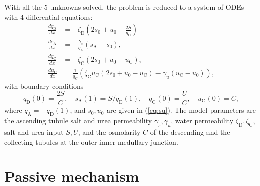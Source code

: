 \documentclass{article}
\numberwithin{equation}{section} %
\begin{document}
With all the 5 unknowns solved, the problem is reduced to a system of ODEs with 4 differential equations:
\begin{align}
    \frac{dq_\mathrm{D}}{dx} &= -\zeta_\mathrm{D}\left( 2s_0+u_0-\frac{2S}{q_\mathrm{D}} \right) \label{eq:sys_q_D}\\
    \frac{ds_\mathrm{A}}{dx} &= -\frac{\gamma_s}{q_\mathrm{A}}(s_\mathrm{A} - s_0),\label{eq:sys_s}\\
    \frac{dq_\mathrm{C}}{dx} &= -\zeta_\mathrm{C}(2s_0+u_0-u_\mathrm{C}),\label{eq:sys_q_C}\\
    \frac{du_\mathrm{C}}{dx} &= \frac{1}{q_\mathrm{C}}\left(\zeta_\mathrm{C}u_\mathrm{C}(2 s_0+u_0 - u_\mathrm{C})- \gamma_u(u_\mathrm{C} - u_0)\right),\label{eq:sys_u}
\end{align}
    with boundary conditions
\begin{equation}\label{eq:sys_bdry}
        q_\mathrm{D}(0) = \frac{2S}{C},\quad
        s_\mathrm{A}(1) = S/q_\mathrm{D}(1),\quad
         q_\mathrm{C}(0) = \frac{U}{C},\quad u_\mathrm{C}(0) = C,
\end{equation}
    where $q_\mathrm{A} = -q_\mathrm{D}(1)$, and $s_0,u_0$ are given in (\ref{eq:su}).
The model parameters are the ascending tubule salt and urea permeability $\gamma_s,\gamma_u$, water permeability $\zeta_\mathrm{D},\zeta_\mathrm{C}$, salt and urea input $S,U$, and the osmolarity $C$ of the descending and the collecting tubules at the outer-inner medullary junction.

\section{Passive mechanism}
\end{document}
